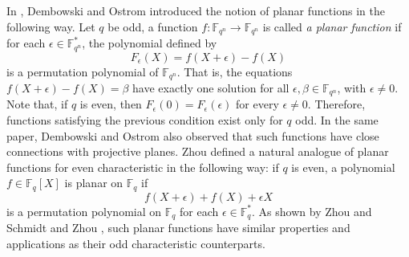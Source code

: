 \documentclass[12pt]{amsart}
\begin{document}
	
	 In \cite{DO}, Dembowski and Ostrom introduced the notion of planar functions in the following way. Let $q$ be odd,  a function $f: \mathbb{F}_{q^n} \rightarrow \mathbb{F}_{q^n}$ is called {\it a planar function} if for each $\epsilon \in \mathbb{F}_{q^n}^{\ast}$, the polynomial defined by $$F_\epsilon(X)=f(X + \epsilon) - f(X)$$ is a permutation polynomial of $\mathbb{F}_{q^n}$. That is, the equations $f(X + \epsilon) - f(X) = \beta$ have exactly one solution for all $\epsilon , \beta \in \mathbb{F}_{q^n}$, with $\epsilon \neq 0$. Note that, if $q$ is even, then $F_{\epsilon}(0) = F_{\epsilon}(\epsilon)$ for every $\epsilon \neq 0$. Therefore, functions satisfying the previous condition exist only for $q$ odd. In the same paper, Dembowski and Ostrom also observed that such functions have close connections with projective planes. Zhou \cite{zhou} defined a natural analogue of planar functions for even characteristic in the following way: if $q$ is even, a polynomial $f \in \mathbb{F}_{q}[X]$ is planar on $\mathbb{F}_{q}$ if $$ f(X + \epsilon) + f(X) + \epsilon X$$ is a permutation polynomial on $\mathbb{F}_{q}$ for each $\epsilon \in \mathbb{F}_{q}^{\ast}$. As shown by Zhou \cite{zhou} and Schmidt and Zhou \cite{SZ}, such planar functions have similar properties and applications as their odd characteristic counterparts. 
	  
\end{document}
